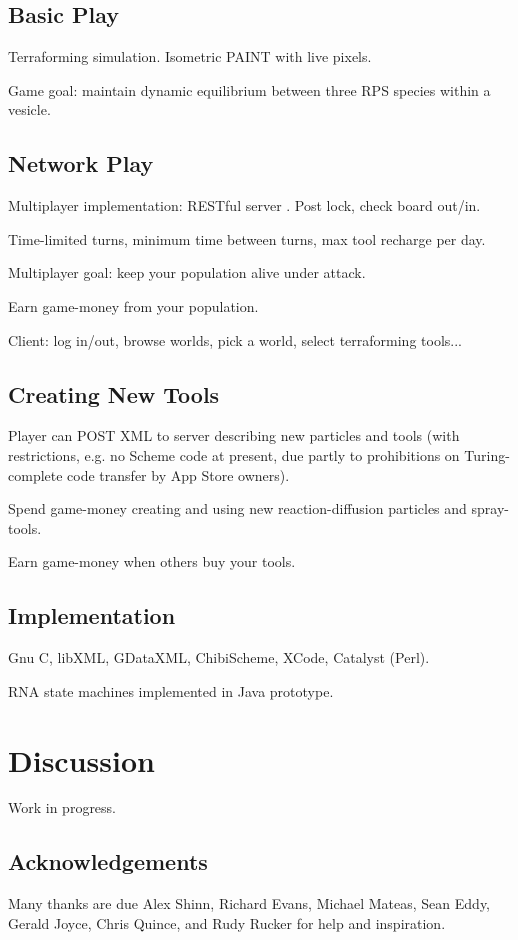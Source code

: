 \documentclass{acm_proc_article-sp}
\begin{document}
\subsection{Basic Play}

Terraforming simulation.
Isometric PAINT with live pixels.

Game goal: maintain dynamic equilibrium between three RPS species within a vesicle.

\subsection{Network Play}

Multiplayer implementation: RESTful server \cite{rest}.
Post lock, check board out/in.

Time-limited turns, minimum time between turns, max tool recharge per day.

Multiplayer goal: keep your population alive under attack.

Earn game-money from your population.

Client: log in/out, browse worlds, pick a world, select terraforming tools...

\subsection{Creating New Tools}

Player can POST XML to server describing new particles and tools
(with restrictions, e.g. no Scheme code at present, due partly to prohibitions on Turing-complete code transfer by App Store owners).

Spend game-money creating and using new reaction-diffusion particles and spray-tools.

Earn game-money when others buy your tools.

\subsection{Implementation}

Gnu C, libXML, GDataXML, ChibiScheme, XCode, Catalyst (Perl).

RNA state machines implemented in Java prototype.

\section{Discussion}

Work in progress.

\subsection{Acknowledgements}

Many thanks are due Alex Shinn, Richard Evans, Michael Mateas, Sean Eddy, Gerald Joyce, Chris Quince,
and Rudy Rucker for help and inspiration.




\balancecolumns
\end{document}

